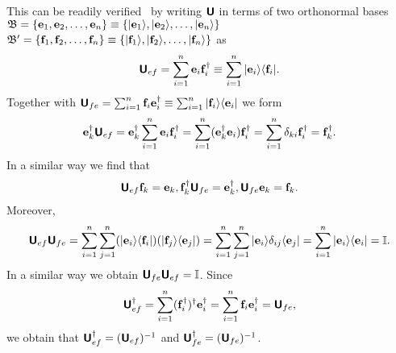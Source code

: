 This can be readily verified~\cite{Schwinger.60} by writing $\textsf{\textbf{U}}$
in terms of two orthonormal bases
${\frak B}=\{{\bf e}_1,  {\bf e}_2, \ldots , {\bf e}_n\}\equiv \{\vert {\bf e}_1\rangle , \vert  {\bf e}_2\rangle , \ldots , \vert {\bf e}_n\rangle \}$
${\frak B}'=\{{\bf f}_1,  {\bf f}_2, \ldots , {\bf f}_n\}\equiv \{\vert {\bf f}_1\rangle , \vert  {\bf f}_2\rangle , \ldots , \vert {\bf f}_n\rangle \}$ as
\begin{equation}
\textsf{\textbf{U}}_{ef}= \sum_{i=1}^n  {\bf e}_i {\bf f}_i^\dagger
\equiv \sum_{i=1}^n  \vert {\bf e}_i\rangle \langle {\bf f}_i \vert
.
\end{equation}
Together with $\textsf{\textbf{U}}_{fe}= \sum_{i=1}^n  {\bf f}_i {\bf e}_i^\dagger \equiv  \sum_{i=1}^n  \vert {\bf f}_i\rangle \langle {\bf e}_i \vert $
we form
\begin{equation}
\begin{split}
{\bf e}_k^\dagger \textsf{\textbf{U}}_{ef}  = {\bf e}_k^\dagger\sum_{i=1}^n  {\bf e}_i {\bf f}_i^\dagger
= \sum_{i=1}^n  ({\bf e}_k^\dagger {\bf e}_i) {\bf f}_i^\dagger
= \sum_{i=1}^n  \delta_{ki} {\bf f}_i^\dagger   = {\bf f}_k^\dagger
.
\end{split}
\end{equation}
In a similar way we find that
\begin{equation}
\begin{split}
\textsf{\textbf{U}}_{ef} {\bf f}_k = {\bf e}_k,
{\bf f}_k^\dagger \textsf{\textbf{U}}_{fe}   = {\bf e}_k^\dagger ,
\textsf{\textbf{U}}_{fe} {\bf e}_k  = {\bf f}_k .
\end{split}
\end{equation}
Moreover,
\begin{equation}
\begin{split}
\textsf{\textbf{U}}_{ef}\textsf{\textbf{U}}_{fe}
=
 \sum_{i=1}^n  \sum_{j=1}^n
(\vert {\bf e}_i\rangle \langle {\bf f}_i \vert )
(\vert {\bf f}_j\rangle \langle {\bf e}_j \vert )
=
 \sum_{i=1}^n  \sum_{j=1}^n
\vert {\bf e}_i\rangle \delta_{ij} \langle {\bf e}_j \vert
=
 \sum_{i=1}^n
\vert {\bf e}_i\rangle   \langle {\bf e}_i \vert
=
{\Bbb I}
.
\end{split}
\end{equation}
In a similar way we obtain
$\textsf{\textbf{U}}_{fe}\textsf{\textbf{U}}_{ef}=
{\Bbb I}$.
Since
\begin{equation}
\textsf{\textbf{U}}_{ef}^\dagger = \sum_{i=1}^n  ( {\bf f}_i^\dagger )^\dagger {\bf e}_i^\dagger
= \sum_{i=1}^n  {\bf f}_i {\bf e}_i^\dagger
= \textsf{\textbf{U}}_{fe},
\end{equation}
we obtain that $\textsf{\textbf{U}}_{ef}^\dagger = (\textsf{\textbf{U}}_{ef})^{-1}$
and $\textsf{\textbf{U}}_{fe}^\dagger = (\textsf{\textbf{U}}_{fe})^{-1}$.

